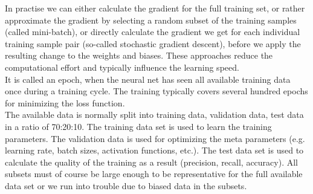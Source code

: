In practise we can either calculate the gradient for the full training set, or rather
approximate the gradient by selecting a random subset of the training samples (called
mini-batch), or directly calculate the gradient we get for each individual training sample
pair (so-called stochastic gradient descent), before we apply the resulting change to the
weights and biases. These approaches reduce the computational effort and typically
influence the learning speed. \\

It is called an epoch, when the neural net has seen all available training data once
during a training cycle. The training typically covers several hundred epochs for
minimizing the loss function. \\

The available data is normally split into training data, validation data, test data in a
ratio of 70:20:10. The training data set is used to learn the training parameters. The
validation data is used for optimizing the meta parameters (e.g. learning rate, batch
sizes, activation functions, etc.). The test data set is used to calculate the quality of
the training as a result (precision, recall, accuracy). All subsets must of course be
large enough to be representative for the full available data set or we run into trouble
due to biased data in the subsets. \\

\newpage
